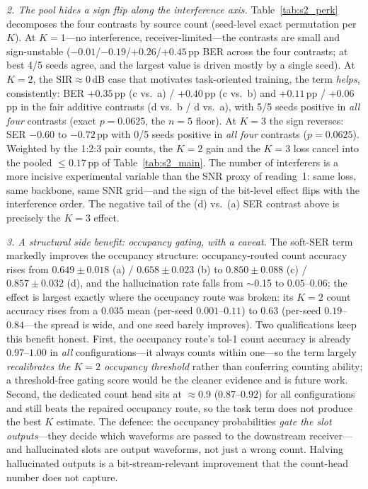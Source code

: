 \documentclass[review,12pt]{elsarticle}
\newcommand{\sir}{\mathrm{SIR}}
\begin{document}
\emph{2. The pool hides a sign flip along the interference axis.}
Table~\ref{tab:s2_perk} decomposes the four contrasts by source count
(seed-level exact permutation per $K$). At $K{=}1$---no interference,
receiver-limited---the contrasts are small and sign-unstable
($-0.01$/$-0.19$/$+0.26$/$+0.45$\,pp BER across the four contrasts; at
best 4/5 seeds agree, and the largest value is driven mostly by a
single seed). At $K{=}2$, the $\sir \approx 0$\,dB case that motivates
task-oriented training, the term \emph{helps}, consistently: BER
$+0.35$\,pp (c vs.\ a) / $+0.40$\,pp (c vs.\ b) and
$+0.11$\,pp / $+0.06$\,pp in the fair additive contrasts (d vs.\ b /
d vs.\ a), with 5/5 seeds
positive in \emph{all four} contrasts (exact $p = 0.0625$, the $n{=}5$
floor). At $K{=}3$ the sign reverses: SER $-0.60$ to $-0.72$\,pp with
0/5 seeds positive in \emph{all four} contrasts ($p = 0.0625$). Weighted
by the 1:2:3 pair counts, the $K{=}2$ gain and the $K{=}3$ loss cancel
into the pooled $\leq 0.17$\,pp of Table~\ref{tab:s2_main}. The number
of interferers is a more incisive experimental variable than the SNR
proxy of reading~1: same loss, same backbone, same SNR grid---and the
sign of the bit-level effect flips with the interference order. The
negative tail of the (d) vs.\ (a) SER contrast above is precisely the
$K{=}3$ effect.



\emph{3. A structural side benefit: occupancy gating, with a caveat.}
The soft-SER term markedly improves the occupancy structure:
occupancy-routed count accuracy rises from $0.649 \pm 0.018$ (a) /
$0.658 \pm 0.023$ (b) to $0.850 \pm 0.088$ (c) / $0.857 \pm 0.032$ (d),
and the hallucination rate falls from $\sim$0.15 to $0.05$--$0.06$; the
effect is largest exactly where the occupancy route was broken: its
$K{=}2$ count accuracy rises from a $0.035$ mean (per-seed
$0.001$--$0.11$) to $0.63$ (per-seed $0.19$--$0.84$---the spread is
wide, and one seed barely improves). Two qualifications keep this
benefit honest. First, the occupancy route's tol-1 count accuracy is
already $0.97$--$1.00$ in \emph{all} configurations---it always counts
within one---so the term largely \emph{recalibrates the $K{=}2$
occupancy threshold} rather than conferring counting ability; a
threshold-free gating score would be the cleaner evidence and is future
work. Second, the dedicated count head sits at $\approx$0.9
($0.87$--$0.92$) for all
configurations and still beats the repaired occupancy route, so the
task term does not produce the best $K$ estimate. The defence: the
occupancy probabilities \emph{gate the slot outputs}---they decide
which waveforms are passed to the downstream receiver---and
hallucinated slots are output waveforms, not just a wrong count.
Halving hallucinated outputs is a bit-stream-relevant improvement that
the count-head number does not capture.
\end{document}
